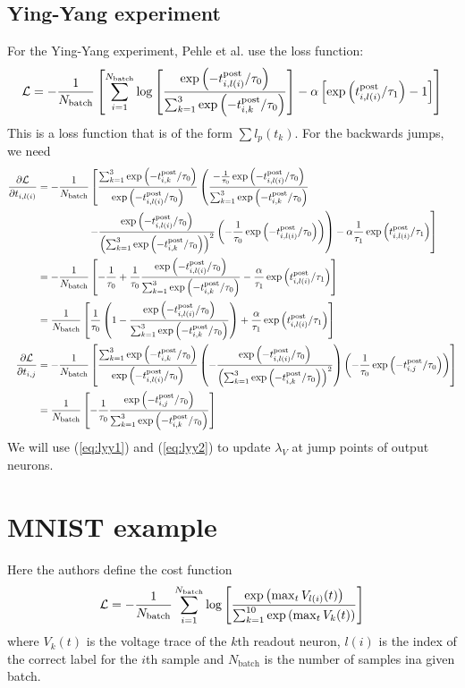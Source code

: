 \documentclass[a4paper]{article}
\begin{document}
\newcommand{\liexp}{\exp\left(-t^{\text{post}}_{i,l(i)}/\tau_0\right)}
\newcommand{\liexpb}{\exp\left(t^{\text{post}}_{i,l(i)}/\tau_1\right)}
\newcommand{\smexp}{\sum_{k=1}^3 \exp\left(-t^{\text{post}}_{i,k}/\tau_0\right)}
\subsection{Ying-Yang experiment}
For the Ying-Yang experiment, Pehle et al. use the loss function:
\begin{align}
  {\cal L}= - \frac{1}{N_{\text{batch}}}
  \left[\sum_{i=1}^{N_{\text{batch}}} \log \left[
      \frac{\liexp}{\smexp}\right] - \alpha
    \left[\liexpb -1 \right] \right]
\end{align} 
This is a loss function that is of the form $\sum l_p(t_k)$. For the
backwards jumps, we need
\begin{align}
  \frac{\partial \cal L}{\partial t_{i,l(i)}} &= -
  \frac{1}{N_{\text{batch}}} \left[\frac{\smexp}{\liexp}
    \left(\frac{-\frac{1}{\tau_0} \liexp}{\smexp} \right. \right.\\
   & \hphantom{= -\frac{1}{N_{\text{batch}}}} \left. \left.
    -\frac{\liexp}{\left(\smexp\right)^2}
    \left(-\frac{1}{\tau_0}\liexp\right)\right) - \alpha
    \frac{1}{\tau_1} \liexpb \right] \\
  &= -
  \frac{1}{N_{\text{batch}}} \left[ -\frac{1}{\tau_0} +
    \frac{1}{\tau_0}\frac{\liexp}{\smexp} -\frac{\alpha}{\tau_1}\liexpb
    \right] \\
  &= 
  \frac{1}{N_{\text{batch}}} \left[\frac{1}{\tau_0} \left(1 -
    \frac{\liexp}{\smexp} \right) + \frac{\alpha}{\tau_1}\liexpb
    \right] \label{eq:lyy1} \\
  \frac{\partial \cal L}{\partial t_{i,j}} &= -
  \frac{1}{N_{\text{batch}}} \left[\frac{\smexp}{\liexp} \left(-\frac{\liexp}{\left(\smexp\right)^2}\right)
    \left(-\frac{1}{\tau_0}\exp\left(-t^{\text{post}}_{i,j}/\tau_0\right)
    \right)\right] \\
  &=  
  \frac{1}{N_{\text{batch}}} \left[ - \frac{1}{\tau_0}
    \frac{\exp\left(-t^{\text{post}}_{i,j}/\tau_0\right)}{\smexp} \right]\label{eq:lyy2} 
\end{align}
We will use (\ref{eq:lyy1}) and (\ref{eq:lyy2}) to update $\lambda_V$
at jump points of output neurons.

\section{MNIST example}
Here the authors define the cost function
\begin{align}
  {\cal L} = - \frac{1}{N_{\text{batch}}} \sum_{i=1}^{N_{\text{batch}}} \log \left[ \frac{\exp\left(\max_t V_{l(i)} (t)\right)}{\sum_{k=1}^{10} \exp\left(\max_t V_k(t)\right)} \right]
\end{align}
where $V_k(t)$ is the voltage trace of the $k$th readout neuron, $l(i)$ is the index of the correct label for the $i$th sample and $N_{\text{batch}}$ is the number of samples ina  given batch.
\end{document}

